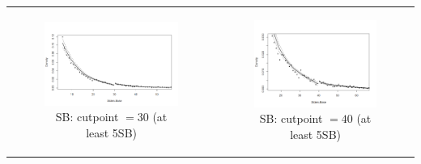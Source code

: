\documentclass[dvipdfmx, 12pt]{article}
\begin{document}
\begin{tabular}{cc}
  \begin{minipage}[H]{0.5\textwidth}
    \begin{figure}[H]
      \centering
      \includegraphics[keepaspectratio, scale = 0.5, angle = 90]
      {graphs/SB_30.png}
      \caption{SB: cutpoint $=30$ (at least 5SB)}
      \label{SB_30}
    \end{figure}

  \end{minipage} &
  \begin{minipage}[H]{0.5\textwidth}
    \begin{figure}[H]
      \centering
      \includegraphics[keepaspectratio, scale = 0.5, angle = 90]
      {graphs/SB_40.png}
      \caption{SB: cutpoint $=40$ (at least 5SB)}
      \label{SB_40}
    \end{figure}


\end{minipage}
\end{tabular}
\end{document}
